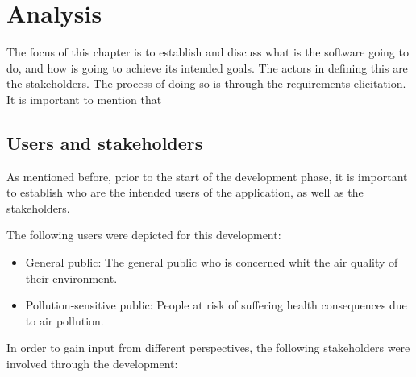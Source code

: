 \chapter{Analysis}
The focus of this chapter is to establish and discuss what is the software going to do, and how is going to achieve its intended goals. The actors in defining this are the stakeholders. The process of doing so is through the requirements elicitation. It is important to mention that  

\section{Users and stakeholders}
As mentioned before, prior to the start of the development phase, it is important to establish who are the intended users of the application, as well as the stakeholders. 

The following users were depicted for this development:

\begin{itemize}
	\item General public: The general public who is concerned whit the air quality of their environment.
    \item Pollution-sensitive public: People at risk of suffering health consequences due to air pollution.
\end{itemize}

In order to gain input from different perspectives, the following stakeholders were involved through the development: 

